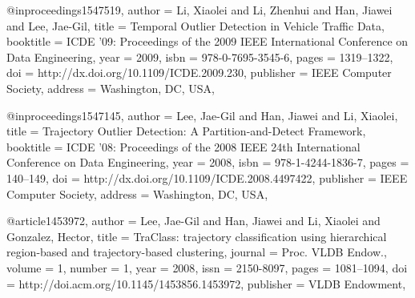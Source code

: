 @inproceedings{1547519,
 author = {Li, Xiaolei and Li, Zhenhui and Han, Jiawei and Lee, Jae-Gil},
 title = {Temporal Outlier Detection in Vehicle Traffic Data},
 booktitle = {ICDE '09: Proceedings of the 2009 IEEE International Conference on Data Engineering},
 year = {2009},
 isbn = {978-0-7695-3545-6},
 pages = {1319--1322},
 doi = {http://dx.doi.org/10.1109/ICDE.2009.230},
 publisher = {IEEE Computer Society},
 address = {Washington, DC, USA},
 }

@inproceedings{1547145,
 author = {Lee, Jae-Gil and Han, Jiawei and Li, Xiaolei},
 title = {Trajectory Outlier Detection: A Partition-and-Detect Framework},
 booktitle = {ICDE '08: Proceedings of the 2008 IEEE 24th International Conference on Data Engineering},
 year = {2008},
 isbn = {978-1-4244-1836-7},
 pages = {140--149},
 doi = {http://dx.doi.org/10.1109/ICDE.2008.4497422},
 publisher = {IEEE Computer Society},
 address = {Washington, DC, USA},
 }

@article{1453972,
 author = {Lee, Jae-Gil and Han, Jiawei and Li, Xiaolei and Gonzalez, Hector},
 title = {TraClass: trajectory classification using hierarchical region-based and trajectory-based clustering},
 journal = {Proc. VLDB Endow.},
 volume = {1},
 number = {1},
 year = {2008},
 issn = {2150-8097},
 pages = {1081--1094},
 doi = {http://doi.acm.org/10.1145/1453856.1453972},
 publisher = {VLDB Endowment},
 }

